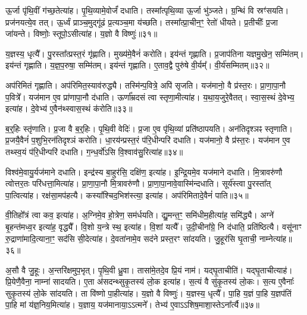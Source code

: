 ऊ॒र्जा पृ॑थि॒वीं ग॑च्छ॒तेत्या॑ह।
पृ॒थि॒व्यामे॒वोर्जं॑ दधाति।
तस्मा᳚त्\-पृथि॒व्या ऊ॒र्जा भु॑ञ्जते।
ग्र॒न्थिं वि स्रꣳ॑सयति।
प्रज॑नयत्ये॒व तत्।
ऊ॒र्ध्वं प्राञ्च॒मुद्गू॑ढं प्र॒त्यञ्च॒मा य॑च्छति।
तस्मा᳚त्प्रा॒चीन॒ꣳ॒ रेतो॑ धीयते।
प्र॒तीचीः᳚ प्र॒जा जा॑यन्ते।
विष्णोः॒ स्तूपो॒\-ऽसीत्या॑ह।
य॒ज्ञो वै विष्णुः॑॥३१॥

य॒ज्ञस्य॒ धृत्यै᳚।
पु॒रस्ता᳚त्प्रस्त॒रं गृ॑ह्णाति।
मुख्य॑मे॒वैनं॑ करोति।
इय॑न्तं गृह्णाति।
प्र॒जा\-प॑तिना यज्ञमु॒खेन॒ सम्मि॑तम्।
इय॑न्तं गृह्णाति।
य॒ज्ञ॒प॒रुषा॒ सम्मि॑तम्।
इय॑न्तं गृह्णाति।
ए॒ताव॒द्वै पुरु॑षे वी॒र्यम्᳚।
वी॒र्य॑सम्मितम्॥३२॥

अप॑रिमितं गृह्णाति।
अप॑रिमित॒स्याव॑रुद्ध्यै।
तस्मि॑न्प॒वित्रे॒ अपि॑ \-सृजति।
यज॑मानो॒ वै प्र॑स्त॒रः।
प्रा॒णा॒पा॒नौ प॒वित्रे᳚।
यज॑मान ए॒व प्रा॑णापा॒नौ द॑धाति।
ऊर्णा᳚म्रदसं त्वा स्तृणा॒मीत्या॑ह।
य॒था॒\-य॒जु\-रे॒वै\-तत्।
स्वा॒स॒स्थं दे॒वेभ्य॒ इत्या॑ह।
दे॒वेभ्य॑ ए॒वैन॑थ्स्वास॒स्थं क॑रोति॥३३॥

ब॒र्॒हिः स्तृ॑णाति।
प्र॒जा वै ब॒र्॒हिः।
पृ॒थि॒वी वेदिः॑।
प्र॒जा ए॒व पृ॑थि॒व्यां प्रति॑\-ष्ठापयति।
अन॑तिदृश्ञꣴ स्तृणाति।
प्र॒जयै॒वैनं॑ प॒शुभि॒रन॑तिदृश्ञं करोति।
धा॒रय॑न्प्रस्त॒रं प॑रि॒धीन्परि॑ दधाति।
यज॑मानो॒ वै प्र॑स्त॒रः।
यज॑मान ए॒व तथ्स्व॒यं प॑रि॒धीन्परि॑ दधाति।
ग॒न्ध॒र्वो॑ऽसि वि॒श्वाव॑सु॒रित्या॑ह॥३४॥

विश्व॑मे॒वायु॒र्यज॑माने दधाति।
इन्द्र॑स्य बा॒हुर॑सि॒ दक्षि॑ण॒ इत्या॑ह।
इ॒न्द्रि॒यमे॒व यज॑माने दधाति।
मि॒त्रावरु॑णौ त्वोत्तर॒तः परि॑धत्ता॒मित्या॑ह।
प्रा॒णा॒पा॒नौ मि॒त्रावरु॑णौ।
प्रा॒णा॒पा॒ना\-वे॒वास्मि॑न्द\-धाति।
सूर्य॑स्त्वा पु॒रस्ता᳚त् पा॒त्वित्या॑ह।
रक्ष॑सा॒मप॑हत्यै।
कस्या᳚श्चिद॒भिश॑स्त्या॒ इत्या॑ह।
अप॑रिमितादे॒वैनं॑ पाति॥३५॥

वी॒तिहो᳚त्रं त्वा कव॒ इत्या॑ह।
अ॒ग्निमे॒व हो॒त्रेण॒ सम॑र्धयति।
द्यु॒मन्त॒ꣳ॒ समि॑धीम॒हीत्या॑ह॒ समि॑द्ध्यै।
अग्ने॑ बृ॒हन्त॑मध्व॒र इत्या॑ह॒ वृद्ध्यै᳚।
वि॒शो य॒न्त्रे स्थ॒ इत्या॑ह।
वि॒शां यत्यै᳚।
उ॒दी॒चीना᳚ग्रे॒ नि द॑धाति॒ प्रति॑\-ष्ठित्यै।
वसू॑नाꣳ रु॒द्राणा॑मादि॒त्याना॒ꣳ॒ सद॑सि सी॒देत्या॑ह।
दे॒वता॑नामे॒व सद॑ने प्रस्त॒रꣳ सा॑दयति।
जु॒हूर॑सि घृ॒ताची॒ नाम्नेत्या॑ह॥३६॥

अ॒सौ वै जु॒हूः।
अ॒न्तरि॑क्षमुप॒भृत्।
पृ॒थि॒वी ध्रु॒वा।
तासा॑मे॒तदे॒व प्रि॒यं नाम॑।
यद्\mbox{}घृ॒ताचीति॑।
यद्\mbox{}घृ॒ताचीत्याह॑।
प्रि॒येणै॒वैना॒ नाम्ना॑ सादयति।
ए॒ता अ॑सदन्थ्सुकृ॒तस्य॑ लो॒क इत्या॑ह।
स॒त्यं वै सु॑कृ॒तस्य॑ लो॒कः।
स॒त्य ए॒वैनाः᳚ सुकृ॒तस्य॑ लो॒के सा॑दयति।
ता वि॑ष्णो पा॒हीत्या॑ह।
य॒ज्ञो वै विष्णुः॑।
य॒ज्ञस्य॒ धृत्यै᳚।
पा॒हि य॒ज्ञं पा॒हि य॒ज्ञप॑तिं पा॒हि मां य॑ज्ञ॒निय॒मित्या॑ह।
य॒ज्ञाय॒ यज॑मानाया॒ऽऽत्मने᳚।
तेभ्य॑ ए॒वाऽऽशिष॒माशा॒स्ते\-ऽना᳚र्त्यै॥३७॥\anuvakamend[स्थेत्या॑ह पृथि॒वी वेदि॒र्यन्ति॑ क्रि॒यते॒ वीणु॑र्वी॒र्य॑सम्मितं करोत्याह पाति॒ नाम्नेत्या॑ह लो॒के सा॑दयति॒ षट् च॑]

